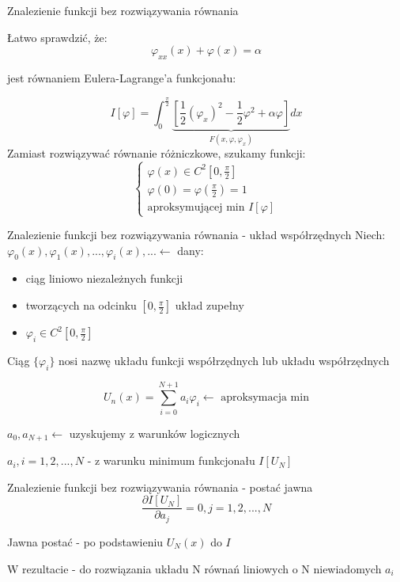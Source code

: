 
	\begin{frame}{Znalezienie funkcji bez rozwiązywania równania}
	
		Łatwo sprawdzić, że:
		$$
		\varphi_{xx}(x) + \varphi(x) = \alpha
		$$
				
		jest równaniem Eulera-Lagrange'a funkcjonału:
				
		$$
		I[\varphi] = \int_0^{\frac{\pi}{2}} \underbrace{[\frac{1}{2}(\varphi_x)^2 - \frac{1}{2}\varphi^2 + \alpha \varphi]}_{F(x,\varphi, \varphi_x)} dx
		$$
		Zamiast rozwiązywać równanie różniczkowe, szukamy funkcji:
		$$
		\begin{cases}
			\varphi(x) \in C^2[0, \frac{\pi}{2}] \\
			\varphi(0) = \varphi(\frac{\pi}{2}) = 1 \\
			\text{aproksymującej min } I[\varphi]
		\end{cases}
		$$		
	\end{frame}
	

	\begin{frame}{Znalezienie funkcji bez rozwiązywania równania - układ współrzędnych}
		Niech: $\varphi_0(x), \varphi_1(x), ... , \varphi_i(x), ... \leftarrow$ dany:
			\begin{itemize}
				\item ciąg liniowo niezależnych funkcji
				\item tworzących na odcinku $[0, \frac{\pi}{2}]$ układ zupełny
				\item $\varphi_i \in C^2 [0, \frac{\pi}{2}]$
			\end{itemize}
			
			Ciąg $\{\varphi_i\}$ nosi nazwę układu funkcji współrzędnych lub układu współrzędnych
			
			$$
			U_n(x) = \sum_{i=0}^{N+1} a_i \varphi_i \leftarrow \text{ aproksymacja min}
			$$
			
			$a_0, a_{N+1} \leftarrow$ uzyskujemy z warunków logicznych
			
			$a_i, i = 1,2, ... , N$ - z warunku minimum funkcjonału $I[U_N]$
	
	\end{frame}

	
	\begin{frame}{Znalezienie funkcji bez rozwiązywania równania - postać jawna}
		$$
		\frac{\partial I[U_N]}{\partial a_j} = 0, j = 1,2, ... , N
		$$
					
		Jawna postać - po podstawieniu $U_N(x)$ do $I$
					
		W rezultacie - do rozwiązania układu N równań liniowych o N niewiadomych $a_i$
					
	\end{frame}

